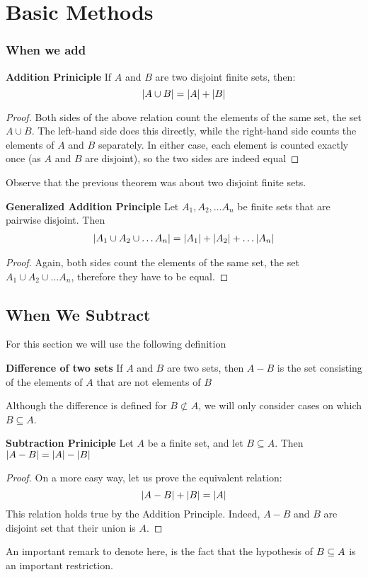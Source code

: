 \chapter{Basic Methods}
\subsection{When we add}
\begin{thm}
	\textbf{Addition Priniciple} If $A$ and $B$ are two disjoint finite sets, then:
	\[ \left|  A \cup B \right| = \left| A \right| + \left| B \right| \]
\end{thm}
\begin{proof}
	Both sides of the above relation count the elements of the same set, the set $ A \cup B$. The left-hand side does this directly, while the right-hand side counts the elements of $A$ and $B$ separately. In either case, each element is counted exactly once (as $A$ and $B$ are disjoint), so the two sides are indeed equal
\end{proof}
Observe that the previous theorem was about two disjoint finite sets.
\begin{thm}
	\textbf{Generalized Addition Principle} Let $ A_1, A_2, \ldots A_n$ be finite sets that are pairwise disjoint. Then
	\begin{align*}
	\left| A_1 \cup A_2 \cup \ldots A_n \right| = \left| A_1 \right| + \left| A_2 \right| + \ldots \left| A_n \right|
	\end{align*}
\end{thm}
\begin{proof}
	Again, both sides count the elements of the same set, the set $ A_1 \cup A_2 \cup \ldots A_n $, therefore they have to be equal.
\end{proof}
\section{When We Subtract}
For this section we will use the following definition
\begin{define}
	\textbf{Difference of two sets} If $A$ and $B$ are two sets, then $A - B$ is the set consisting of the elements of $A$ that are not elements of $B$
\end{define}
Although the difference is defined for $B \not \subset A$, we will only consider cases on which $ B \subseteq A$.
\begin{thm}
	\textbf{Subtraction Priniciple} Let $A$ be a finite set, and let $ B \subseteq A$. Then $ \left|  A - B \right| = \left| A \right| - \left| B \right|$
\end{thm}
\begin{proof}
	On a more easy way, let us prove the equivalent relation:
	\[ \left| A - B \right| + \left| B \right| = \left| A \right| \]
	This relation holds true by the Addition Principle. Indeed, $A - B$ and $B$ are disjoint set that their union is $A$.
\end{proof}
An important remark to denote here, is the fact that the hypothesis of $ B \subseteq A $ is an important restriction.

